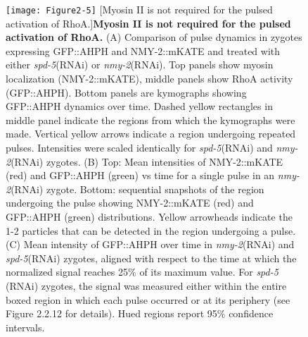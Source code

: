 \documentclass{ucetd}
\begin{document}
\begin{figure}[!htbp]
\centering
\texttt{[image: Figure2-5]}
[Myosin II is not required for the pulsed activation of RhoA.]{\textbf{Myosin II is not required for the pulsed activation of RhoA.} (A) Comparison of pulse dynamics in zygotes expressing GFP::AHPH and NMY-2::mKATE and treated with either \textit{spd-5}(RNAi) or \textit{nmy-2}(RNAi). Top panels show myosin localization (NMY-2::mKATE), middle panels show RhoA activity (GFP::AHPH). Bottom panels are kymographs showing GFP::AHPH dynamics over time.  Dashed yellow rectangles in middle panel indicate the regions from which the kymographs were made. Vertical yellow arrows indicate a region undergoing repeated pulses. Intensities were scaled identically for \textit{spd-5}(RNAi) and \textit{nmy-2}(RNAi) zygotes. (B) Top: Mean intensities of NMY-2::mKATE (red) and GFP::AHPH (green) vs time for a single pulse in an \textit{nmy-2}(RNAi) zygote. Bottom: sequential snapshots of the region undergoing the pulse showing NMY-2::mKATE (red) and GFP::AHPH (green) distributions. Yellow arrowheads indicate the  1-2 particles that can be detected in the region undergoing a pulse. (C) Mean intensity of GFP::AHPH over time in \textit{nmy-2}(RNAi) and \textit{spd-5}(RNAi) zygotes, aligned with respect to the time at which the normalized signal reaches 25$\%$ of its maximum value.  For \textit{spd-5} (RNAi) zygotes, the signal was measured either within the entire boxed region in which each pulse occurred  or at its periphery (see Figure 2.2.12 for details). Hued regions report 95$\%$ confidence intervals.}
\end{figure}
\end{document}
